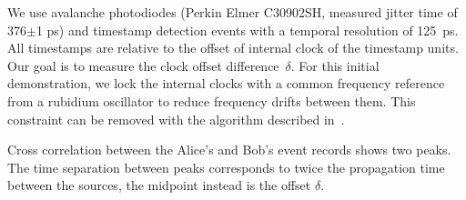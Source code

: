 \documentclass[aps,pra,onecolumn, superscriptaddress]{revtex4}
\begin{document}

We use avalanche photodiodes (Perkin Elmer C30902SH, measured jitter time of 376$\pm$1 ps) and timestamp detection events with a temporal resolution of 125~ps.
All timestamps are relative to the offset of internal clock of the timestamp units.
Our goal is to measure the clock offset difference~$\delta$.
For this initial demonstration, we lock the internal clocks
with a common frequency reference from a rubidium oscillator
to reduce frequency drifts between them.
This constraint can be removed with the algorithm described in~\cite{Ho2009}.






Cross correlation between the Alice's and Bob's event records shows two peaks. The time separation between peaks corresponds to twice the propagation time between the sources, the midpoint instead is the offset $\delta$.



\end{document}
